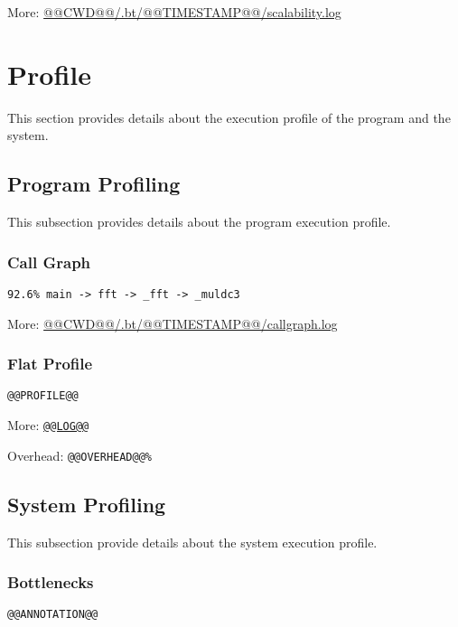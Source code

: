\documentclass[a4paper]{article}
\begin{document}
More: \href{@@CWD@@/.bt/@@TIMESTAMP@@/scalability.log}{@@CWD@@/.bt/@@TIMESTAMP@@/scalability.log}

\section{Profile}

This section provides details about the execution profile of the program and the system.

\subsection{Program Profiling}

This subsection provides details about the program execution profile.

\subsubsection{Call Graph}

\begin{verbatim}
92.6% main -> fft -> _fft -> _muldc3
\end{verbatim}

More: \href{@@CWD@@/.bt/@@TIMESTAMP@@/callgraph.log}{@@CWD@@/.bt/@@TIMESTAMP@@/callgraph.log}

\subsubsection{Flat Profile}

\begin{verbatim}
@@PROFILE@@
\end{verbatim}

More: \href{TBD}{\tt @@LOG@@}

Overhead: {\tt @@OVERHEAD@@\%}

\subsection{System Profiling}

This subsection provide details about the system execution profile.

\subsubsection{Bottlenecks}

\begin{verbatim}
@@ANNOTATION@@
\end{verbatim}
\end{document}
